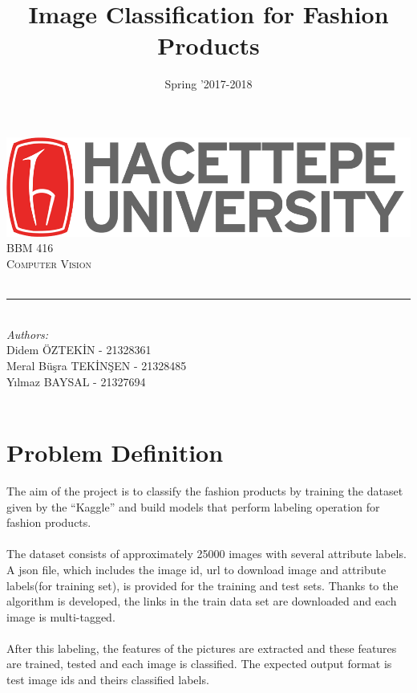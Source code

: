 \documentclass[12pt]{article}
\title{Image Classification for Fashion Products}								%
\author{}			%
\date{Spring ’2017-2018}											%
\makeatletter
\let\thetitle\@title
\let\thedate\@date
\makeatother
\begin{document}

\begin{titlepage}
	\centering
    \vspace*{0.5 cm}
    
    \includegraphics[scale = 0.3]{hu_logo.png}\\[1.2 cm]
	\textsc{\Large BBM 416}\\[0.5 cm]
	\textsc{\large Computer Vision}\\[2 cm]
    
	{ \huge \bfseries \thetitle}\\
	\rule{\linewidth}{0.2 mm} \\[1.5 cm]
	
    \emph{Authors:} \\ [0.5 cm]
    Didem ÖZTEKİN - 21328361 \\ [0.4 cm]
    Meral Büşra TEKİNŞEN - 21328485 \\ [0.4 cm]
    Yılmaz BAYSAL - 21327694 \\ [4 cm]
	
    {\large \thedate}\\[2 cm]
\end{titlepage}

\pagebreak


\tableofcontents
\pagebreak


\section{Problem Definition}

The aim of the project is to classify the fashion products by training the dataset given by the “Kaggle” and build models that perform labeling operation for fashion products.\\
	\\The dataset consists of approximately 25000 images with several attribute labels. A json file, which includes the image id, url to download image and attribute labels(for training set), is provided for the training and test sets. Thanks to the algorithm is developed, the links in the train data set are downloaded and each image is multi-tagged.\\
	\\After this labeling, the features of the pictures are extracted and these features are trained, tested and each image is classified. The expected output format is test image ids and theirs classified labels. 
\end{document}
